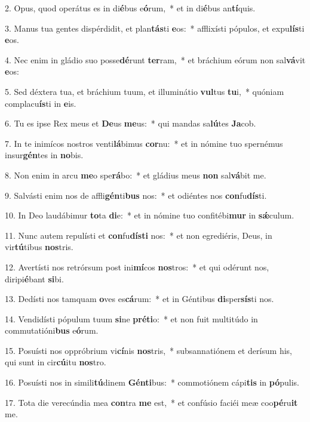 2. Opus, quod operátus es in di\textbf{é}bus e\textbf{ó}rum,~*  et in di\textbf{é}bus an\textbf{tí}quis.\

3. Manus tua gentes dispérdidit, et plan\textbf{tás}ti \textbf{e}os:~*  afflixísti pópulos, et expu\textbf{lís}ti \textbf{e}os.\

4. Nec enim in gládio suo posse\textbf{dé}runt \textbf{ter}ram,~*  et bráchium eórum non sal\textbf{vá}vit \textbf{e}os:\

5. Sed déxtera tua, et bráchium tuum, et illuminátio \textbf{vul}tus \textbf{tu}i,~*  quóniam complacu\textbf{ís}ti in \textbf{e}is.\

6. Tu es ipse Rex meus et \textbf{De}us \textbf{me}us:~*  qui mandas sa\textbf{lú}tes \textbf{Ja}cob.\

7. In te inimícos nostros venti\textbf{lá}bimus \textbf{cor}nu:~*  et in nómine tuo spernémus insur\textbf{gén}tes in \textbf{no}bis.\

8. Non enim in arcu \textbf{me}o spe\textbf{rá}bo:~*  et gládius meus \textbf{non} sal\textbf{vá}bit me.\

9. Salvásti enim nos de affli\textbf{gén}ti\textbf{bus} nos:~*  et odiéntes nos \textbf{con}fu\textbf{dís}ti.\

10. In Deo laudábimur \textbf{to}ta \textbf{di}e:~*  et in nómine tuo confitébi\textbf{mur} in \textbf{sǽ}culum.\

11. Nunc autem repulísti et \textbf{con}fu\textbf{dís}\textbf{ti} nos:~*  et non egrediéris, Deus, in vir\textbf{tú}tibus \textbf{nos}tris.\

12. Avertísti nos retrórsum post ini\textbf{mí}cos \textbf{nos}tros:~*  et qui odérunt nos, diripi\textbf{é}bant \textbf{si}bi.\

13. Dedísti nos tamquam \textbf{o}ves es\textbf{cá}rum:~*  et in Géntibus \textbf{di}sper\textbf{sís}ti nos.\

14. Vendidísti pópulum tuum \textbf{si}ne \textbf{pré}\textbf{ti}o:~*  et non fuit multitúdo in commutatióni\textbf{bus} e\textbf{ó}rum.\

15. Posuísti nos oppróbrium vi\textbf{cí}nis \textbf{nos}tris,~*  subsannatiónem et derísum his, qui sunt in cir\textbf{cú}itu \textbf{nos}tro.\

16. Posuísti nos in simili\textbf{tú}dinem \textbf{Gén}\textbf{ti}bus:~*  commotiónem cápi\textbf{tis} in \textbf{pó}pulis.\

17. Tota die verecúndia mea \textbf{con}tra \textbf{me} est,~*  et confúsio faciéi meæ coo\textbf{pé}ru\textbf{it} me.\

